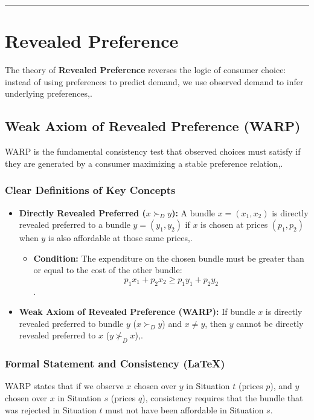 \documentclass{article}
\begin{document}
\hrule

\section{Revealed Preference}

The theory of \textbf{Revealed Preference} reverses the logic of consumer choice: instead of using preferences to predict demand, we use observed demand to infer underlying preferences,.

\subsection{Weak Axiom of Revealed Preference (WARP)}

WARP is the fundamental consistency test that observed choices must satisfy if they are generated by a consumer maximizing a stable preference relation,.

\subsubsection*{Clear Definitions of Key Concepts}
\begin{itemize}
    \item \textbf{Directly Revealed Preferred ($x \succ_D y$):} A bundle $x = (x_1, x_2)$ is directly revealed preferred to a bundle $y = (y_1, y_2)$ if $x$ is chosen at prices $(p_1, p_2)$ when $y$ is also affordable at those same prices,.
    \begin{itemize}
        \item \textbf{Condition:} The expenditure on the chosen bundle must be greater than or equal to the cost of the other bundle: \[p_1 x_1 + p_2 x_2 \geq p_1 y_1 + p_2 y_2\].
    \end{itemize}
    \item \textbf{Weak Axiom of Revealed Preference (WARP):} If bundle $x$ is directly revealed preferred to bundle $y$ ($x \succ_D y$) and $x \neq y$, then $y$ cannot be directly revealed preferred to $x$ ($y \not\succ_D x$),.
\end{itemize}

\subsubsection*{Formal Statement and Consistency (LaTeX)}

WARP states that if we observe $x$ chosen over $y$ in Situation $t$ (prices $p$), and $y$ chosen over $x$ in Situation $s$ (prices $q$), consistency requires that the bundle that was rejected in Situation $t$ must not have been affordable in Situation $s$.
\end{document}
